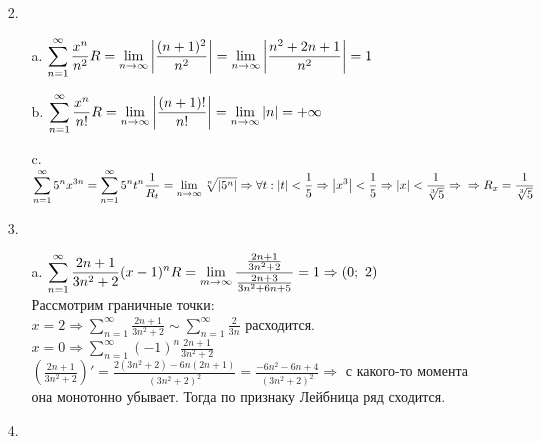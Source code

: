 \documentclass[12pt, letterpaper, twoside]{article}
\newcommand{\DS}{\displaystyle}
\newcommand{\oo}{\infty}
\newcommand{\Abs}[1]{\left| #1 \right|}
\begin{document}
    \begin{enumerate}
        \item[2.]
        \begin{enumerate}
            \item[a.] $\DS \sum_{n = 1}^{\oo} \frac{x^n}{n^2}\\
            R = \lim_{n\rightarrow \oo} \Abs{\frac{(n + 1)^2}{n^2}} = \lim_{n\rightarrow \oo}\Abs{\frac{n^2 + 2n + 1}{n^2}} = 1$
            \item[b.] $\DS \sum_{n = 1}^{\oo} \frac{x^n}{n!}\\
            R = \lim_{n\rightarrow \oo} \Abs{\frac{(n + 1)!}{n!}} = \lim_{n\rightarrow \oo} |n| = +\oo$
            \item[c.] $\DS \sum_{n = 1}^{\oo} 5^n x^{3n} = \sum_{n = 1}^{\oo} 5^n t^{n}\\
            \frac{1}{R_t} = \lim_{n\rightarrow \oo} \sqrt[n]{\Abs{5^n}}\Rightarrow \forall t: \Abs{t} < \frac{1}{5}\Rightarrow \Abs{x^3} < \frac{1}{5}\Rightarrow \Abs{x} < \frac{1}{\sqrt[3]{5}}\Rightarrow\\
            \Rightarrow R_x = \frac{1}{\sqrt[3]{5}}$
        \end{enumerate}
        \item[3.]
        \begin{enumerate}
            \item[a.] $\DS \sum_{n = 1}^{\oo} \frac{2n + 1}{3n^2 + 2}(x - 1)^n\\
            R = \lim_{m\rightarrow \oo} \frac{\frac{2n + 1}{3n^2 + 2}}{\frac{2n + 3}{3n^2 + 6n + 5}} = 1\Rightarrow (0;\ 2)$\\
            Рассмотрим граничные точки:\\
            $x = 2\Rightarrow \DS\sum_{n = 1}^{\oo} \frac{2n + 1}{3n^2 + 2} \sim \sum_{n = 1}^{\oo}\frac{2}{3n}$ расходится.\\
            $x = 0\Rightarrow \DS\sum_{n =1}^{\oo} (-1)^n \frac{2n + 1}{3n^2 + 2}$\\
            $\left( \frac{2n + 1}{3n^2 + 2} \right)' =  \frac{2(3n^2 + 2) - 6n(2n + 1)}{(3n^2 + 2)^2} = \frac{-6n^2 - 6n + 4}{(3n^2 + 2)^2}\Rightarrow$ с какого-то момента она монотонно убывает. Тогда по признаку Лейбница ряд сходится.
        \end{enumerate}
        \item[4.]
\end{enumerate}
\end{document}
